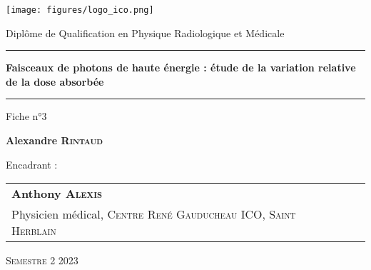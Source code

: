 \begin{titlepage}

    \unitlength 1cm
    \begin{center}
    
    \vspace*{1cm}
    

    \texttt{[image: figures/logo\_ico.png]}
    
    \vspace{2cm}
    
               {\Large Diplôme de Qualification en Physique Radiologique et Médicale\\}
               
    \vspace{2cm}           
    
    
    \rule{16cm}{0.7pt}
    
    \vspace{12pt}
               
               {\LARGE \bf Faisceaux de photons de haute énergie : étude de la variation relative de la dose absorbée\\}
               
    \vspace{12pt}
    \rule{16cm}{0.7pt}

    \vspace{2cm}

                {\large Fiche n°3}
    
    \vspace{1.5cm}

               {\Large\bf {Alexandre \textsc{Rintaud}}}
    
    \vspace{1.5cm}
    
    \end{center}
    
    Encadrant :
    
    \small {
    \begin{tabular}{llr}\\
    \textbf{Anthony \textsc{Alexis}}   &  &  \\
      Physicien médical, \textsc{Centre René Gauducheau ICO, Saint Herblain} &    &  \\
    
    \end{tabular}
    }

    \vspace{1.5cm}


    \begin{center}
    \textsc{Semestre 2 2023}
    \end{center}
    
\end{titlepage}
\let\cleardoublepage\clearpage
